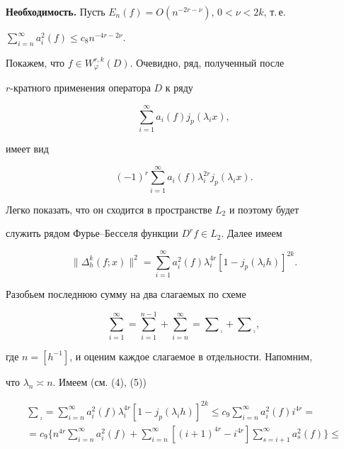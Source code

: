 \begin{pf}
\smallskip 


 


{\bf Необходимость.} Пусть $E_n(f)=O(n^{-2r-\nu})$, $0<\nu<2k$, т.\,е. 


$\sum\limits^\infty_{i=n}a^2_i(f)\le c_8n^{-4r-2\nu}$. 


Покажем, что $f\in W^{r,k}_\varphi(D)$. Очевидно, ряд, полученный после 


$r$-кратного применения оператора $D$ к ряду 


$$ 


\sum^\infty_{i=1}a_i(f)j_p(\lambda_i x), 


$$ 


имеет вид 


$$ 


(-1)^r\sum^\infty_{i=1}a_i(f)\lambda^{2r}_i j_p(\lambda_i x). 


$$ 


Легко показать, что он сходится в пространстве $L_2$ и поэтому будет 


служить рядом Фурье--Бесселя функции $D^r f\in L_2$. Далее имеем 


$$ 


\|\Delta^k_h(f;x)\|^2=\sum^\infty_{i=1} 


a^2_i(f)\lambda^{4r}_i[1-j_p(\lambda_i h)]^{2k}. 


$$ 


Разобьем последнюю сумму на два слагаемых по схеме 


$$ 


\sum^\infty_{i=1}=\sum^{n-1}_{i=1}+\sum^\infty_{i=n}= 


\sum{}_{{}_{{}_1}}+\sum{}_{{}_{{}_2}}, 


$$ 


где $n=[h^{-1}]$, и оценим каждое слагаемое в отдельности. Напомним, 


что $\lambda_n\asymp n$. Имеем (см. (4), (5)) 


\begin{multline*} 


\sum{}_{{}_{{}_2}}=\sum^\infty_{i=n}a^2_i(f)\lambda^{4r}_i 


[1-j_p(\lambda_i h)]^{2k}\le c_9\sum^\infty_{i=n}a^2_i(f)i^{4r}=\\ 


% 


=c_9\bigg\{n^{4r}\sum^\infty_{i=n}a^2_i(f)+\sum^\infty_{i=n} 


[(i+1)^{4r}-i^{4r}]\sum^\infty_{s=i+1}a^2_s(f)\bigg\}\le \\ 



\end{multline*}
\end{pf}
